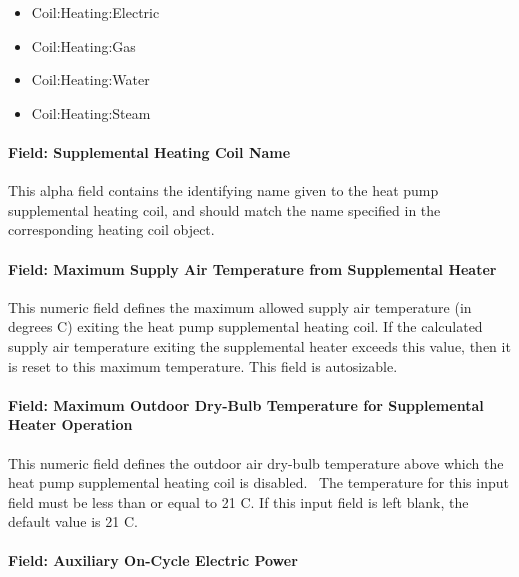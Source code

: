 \begin{itemize}
\item
  Coil:Heating:Electric
\item
  Coil:Heating:Gas
\item
  Coil:Heating:Water
\item
  Coil:Heating:Steam
\end{itemize}

\paragraph{Field: Supplemental Heating Coil Name}\label{field-supplemental-heating-coil-name-2}

This alpha field contains the identifying name given to the heat pump supplemental heating coil, and should match the name specified in the corresponding heating coil object.

\paragraph{Field: Maximum Supply Air Temperature from Supplemental Heater}\label{field-maximum-supply-air-temperature-from-supplemental-heater-1}

This numeric field defines the maximum allowed supply air temperature (in degrees C) exiting the heat pump supplemental heating coil. If the calculated supply air temperature exiting the supplemental heater exceeds this value, then it is reset to this maximum temperature. This field is autosizable.

\paragraph{Field: Maximum Outdoor Dry-Bulb Temperature for Supplemental Heater Operation}\label{field-maximum-outdoor-dry-bulb-temperature-for-supplemental-heater-operation-2}

This numeric field defines the outdoor air dry-bulb temperature above which the heat pump supplemental heating coil is disabled.~ The temperature for this input field must be less than or equal to 21 C. If this input field is left blank, the default value is 21 C.

\paragraph{Field: Auxiliary On-Cycle Electric Power}\label{field-auxiliary-on-cycle-electric-power}

